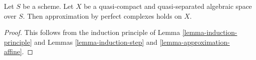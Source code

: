 \begin{theorem}
\label{theorem-approximation}
Let $S$ be a scheme.
Let $X$ be a quasi-compact and quasi-separated algebraic space over $S$.
Then approximation by perfect complexes holds on $X$.
\end{theorem}

\begin{proof}
This follows from the induction principle of
Lemma \ref{lemma-induction-principle}
and Lemmas \ref{lemma-induction-step} and \ref{lemma-approximation-affine}.
\end{proof}























